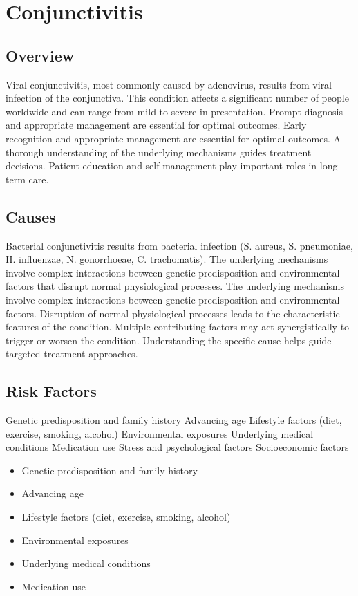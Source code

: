\chapter{Conjunctivitis}
\label{sec:Conjunctivitis}

\section{Overview}
Viral conjunctivitis, most commonly caused by adenovirus, results from viral infection of the conjunctiva. This condition affects a significant number of people worldwide and can range from mild to severe in presentation. Prompt diagnosis and appropriate management are essential for optimal outcomes. Early recognition and appropriate management are essential for optimal outcomes. A thorough understanding of the underlying mechanisms guides treatment decisions. Patient education and self-management play important roles in long-term care.
\section{Causes}
Bacterial conjunctivitis results from bacterial infection (S. aureus, S. pneumoniae, H. influenzae, N. gonorrhoeae, C. trachomatis). The underlying mechanisms involve complex interactions between genetic predisposition and environmental factors that disrupt normal physiological processes. The underlying mechanisms involve complex interactions between genetic predisposition and environmental factors. Disruption of normal physiological processes leads to the characteristic features of the condition. Multiple contributing factors may act synergistically to trigger or worsen the condition. Understanding the specific cause helps guide targeted treatment approaches.
\section{Risk Factors}
Genetic predisposition and family history Advancing age Lifestyle factors (diet, exercise, smoking, alcohol) Environmental exposures Underlying medical conditions Medication use Stress and psychological factors Socioeconomic factors

\begin{itemize}[noitemsep]
  \item Genetic predisposition and family history
  \item Advancing age
  \item Lifestyle factors (diet, exercise, smoking, alcohol)
  \item Environmental exposures
  \item Underlying medical conditions
  \item Medication use
\end{itemize}
